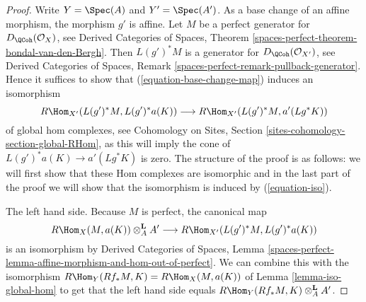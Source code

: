\begin{proof}
Write $Y = \Spec(A)$ and $Y' = \Spec(A')$. As a base change of an affine
morphism, the morphism $g'$ is affine. Let $M$ be a perfect generator
for $D_\QCoh(\mathcal{O}_X)$, see Derived Categories of Spaces, Theorem
\ref{spaces-perfect-theorem-bondal-van-den-Bergh}. Then $L(g')^*M$ is a
generator for $D_\QCoh(\mathcal{O}_{X'})$, see
Derived Categories of Spaces, Remark
\ref{spaces-perfect-remark-pullback-generator}.
Hence it suffices to show that (\ref{equation-base-change-map})
induces an isomorphism
\begin{equation}
\label{equation-iso}
R\Hom_{X'}(L(g')^*M, L(g')^*a(K))
\longrightarrow
R\Hom_{X'}(L(g')^*M, a'(Lg^*K))
\end{equation}
of global hom complexes, see
Cohomology on Sites, Section \ref{sites-cohomology-section-global-RHom},
as this will imply the cone of $L(g')^*a(K) \to a'(Lg^*K)$
is zero.
The structure of the proof is as follows: we will first show that
these Hom complexes are isomorphic and in the last part of the proof
we will show that the isomorphism is induced by (\ref{equation-iso}).

\medskip\noindent
The left hand side. Because $M$ is perfect, the canonical map
$$
R\Hom_X(M, a(K)) \otimes^\mathbf{L}_A A'
\longrightarrow
R\Hom_{X'}(L(g')^*M, L(g')^*a(K))
$$
is an isomorphism by Derived Categories of Spaces, Lemma
\ref{spaces-perfect-lemma-affine-morphism-and-hom-out-of-perfect}.
We can combine this with the isomorphism
$R\Hom_Y(Rf_*M, K) = R\Hom_X(M, a(K))$
of Lemma \ref{lemma-iso-global-hom}
to get that the left hand side equals
$R\Hom_Y(Rf_*M, K) \otimes^\mathbf{L}_A A'$.


\end{proof}
